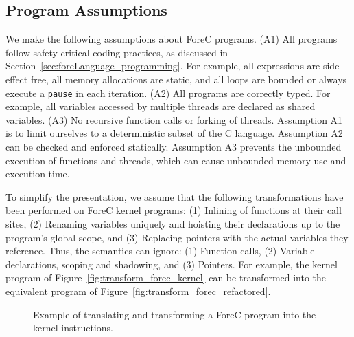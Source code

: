 \subsection{Program Assumptions}
We make the following assumptions about ForeC programs. 
(A1) All programs follow safety-critical coding practices,
as discussed in Section~\ref{sec:foreLanguage_programming}.
For example, all expressions are side-effect free, 
all memory allocations are static, and all loops are 
bounded or always execute a \verb$pause$ in each iteration.
(A2) All programs are correctly typed. For example, all 
variables accessed by multiple threads are declared 
as shared variables. 
(A3) No recursive function calls or forking of threads.
Assumption A1 is to limit ourselves to a deterministic 
subset of the C language. Assumption A2 can be checked
and enforced statically. Assumption A3 prevents the unbounded 
execution of functions and threads, which can cause unbounded
memory use and execution time.

To simplify the presentation, we 
assume that the following transformations have been performed on 
ForeC kernel programs: (1) Inlining of functions at their call sites, 
(2) Renaming variables uniquely and hoisting their declarations 
up to the program's global scope, and (3) Replacing pointers 
with the actual variables they reference. 
Thus, the semantics can ignore: (1) Function calls, (2) Variable 
declarations, scoping and shadowing, and (3) Pointers.
For example, the kernel program of 
Figure~\ref{fig:transform_forec_kernel} can be
transformed into the equivalent program of 
Figure~\ref{fig:transform_forec_refactored}.

\begin{figure}
	\hfill
	
	
	\caption{Example of translating and transforming a ForeC program into the kernel instructions.}
	\label{fig:transform_forec}
\end{figure}



